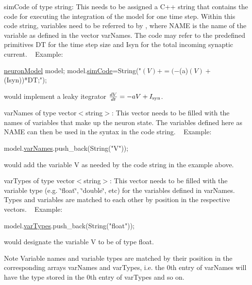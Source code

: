 \begin{DoxyItemize}
\item {\ttfamily sim\+Code} of type {\ttfamily string\+:} This needs to be assigned a C++ string that contains the code for executing the integration of the model for one time step. Within this code string, variables need to be referred to by , where N\+A\+M\+E is the name of the variable as defined in the vector var\+Names. The code may refer to the predefined primitives {\ttfamily D\+T} for the time step size and {\ttfamily Isyn} for the total incoming synaptic current. ~\newline
 Example\+: 
\begin{DoxyCode}
\hyperlink{structneuronModel}{neuronModel} model;
model.\hyperlink{structneuronModel_a9e6536fd15b69fa24b708e41f97df899}{simCode}=String(\textcolor{stringliteral}{"$(V)+= (-$(a)$(V)+$(Isyn))*DT;"});
\end{DoxyCode}
 would implement a leaky itegrator $\frac{dV}{dt}= -a V + I_{{\rm syn}}$.
\item {\ttfamily var\+Names} of type {\ttfamily vector$<$string$>$}\+: This vector needs to be filled with the names of variables that make up the neuron state. The variables defined here as {\ttfamily N\+A\+M\+E} can then be used in the syntax {\ttfamily } in the code string. ~\newline
 Example\+: 
\begin{DoxyCode}
model.\hyperlink{structneuronModel_a9a9156ffb643572fd67f6e585ef79ad0}{varNames}.push\_back(String(\textcolor{stringliteral}{"V"}));
\end{DoxyCode}
 would add the variable V as needed by the code string in the example above.
\item {\ttfamily var\+Types} of type {\ttfamily vector$<$string$>$}\+: This vector needs to be filled with the variable type (e.\+g. \char`\"{}float\char`\"{}, \char`\"{}double\char`\"{}, etc) for the variables defined in {\ttfamily var\+Names}. Types and variables are matched to each other by position in the respective vectors. ~\newline
 Example\+: 
\begin{DoxyCode}
model.\hyperlink{structneuronModel_a86788cb29131da0a26ce79693a076352}{varTypes}.push\_back(String(\textcolor{stringliteral}{"float"}));
\end{DoxyCode}
 would designate the variable V to be of type float. \begin{DoxyNote}{Note}
Variable names and variable types are matched by their position in the corresponding arrays {\ttfamily var\+Names} and {\ttfamily var\+Types}, i.\+e. the 0th entry of {\ttfamily var\+Names} will have the type stored in the 0th entry of {\ttfamily var\+Types} and so on.
\end{DoxyNote}


\end{DoxyItemize}
